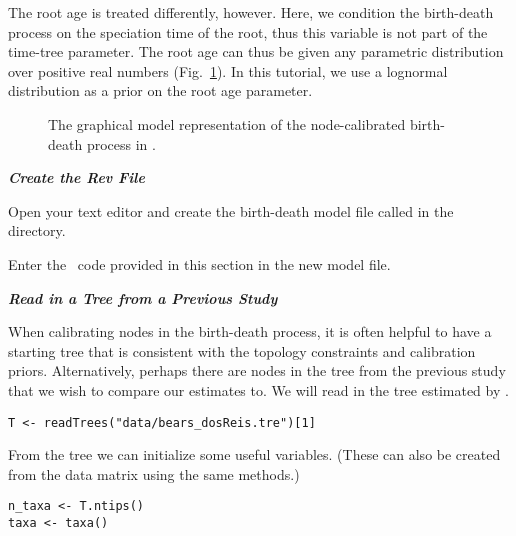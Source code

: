The root age is treated differently, however. 
Here, we condition the birth-death process on the speciation time of the root, thus this variable is not part of the time-tree parameter. 
The root age can thus be given any parametric distribution over positive real numbers (Fig.~\ref{m_BDCal:fig}).
In this tutorial, we use a lognormal distribution as a prior on the root age parameter.

\begin{figure}[h!]
\centering
{}
\caption{\small The graphical model representation of the node-calibrated birth-death process in \RevBayes.}
\label{m_BDCal:fig}
\end{figure}

\textbf{\textit{Create the Rev File}}

{\begin{framed}
Open your text editor and create the birth-death model file called {\textcolor{red}{}} in the  directory.

Enter the \Rev~code provided in this section in the new model file.
\end{framed}}


\textbf{\textit{Read in a Tree from a Previous Study}}

When calibrating nodes in the birth-death process, it is often helpful to have a starting tree that is consistent with the topology constraints and calibration priors.
Alternatively, perhaps there are nodes in the tree from the previous study that we wish to compare our estimates to. 
We will read in the tree estimated by \citet{dosReis2012}. 
{\tt \begin{snugshade*}
\begin{lstlisting}
T <- readTrees("data/bears_dosReis.tre")[1]
\end{lstlisting}
\end{snugshade*}}

From the tree we can initialize some useful variables. (These can also be created from the data matrix using the same methods.)
{\tt \begin{snugshade*}
\begin{lstlisting}
n_taxa <- T.ntips()
taxa <- taxa()
\end{lstlisting}
\end{snugshade*}}


